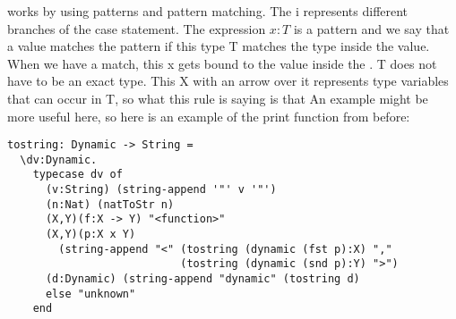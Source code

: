 \documentclass[12pt]{article}	%
\begin{document}
\typecase works by using patterns and pattern matching. The i represents different branches of the case statement. The expression $x:T$ is a pattern and we say that a \Dynamic value matches the pattern if this type T matches the type inside the \Dynamic value. When we have a match, this x gets bound to the value inside the \Dynamic. T does not have to be an exact type. This X with an arrow over it represents type variables that can occur in T, so what this rule is saying is that 
An example might be more useful here, so here is an example of the print function from before:

\begin{verbatim}
tostring: Dynamic -> String = 
  \dv:Dynamic.
    typecase dv of
      (v:String) (string-append '"' v '"')
      (n:Nat) (natToStr n)
      (X,Y)(f:X -> Y) "<function>"
      (X,Y)(p:X x Y)
        (string-append "<" (tostring (dynamic (fst p):X) ","
                           (tostring (dynamic (snd p):Y) ">")
      (d:Dynamic) (string-append "dynamic" (tostring d)
      else "unknown"
    end
\end{verbatim}



\end{document}
